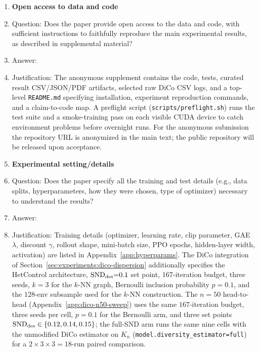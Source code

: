 \begin{enumerate}
\item {\bf Open access to data and code}
    \item[] Question: Does the paper provide open access to the data and code, with sufficient instructions to faithfully reproduce the main experimental results, as described in supplemental material?
    \item[] Answer: \answerYes{}
    \item[] Justification: The anonymous supplement contains the code,
    tests, curated result CSV/JSON/PDF artifacts, selected raw DiCo CSV
    logs, and a top-level \texttt{README.md} specifying installation,
    experiment reproduction commands, and a claim-to-code map. A
    preflight script
    (\texttt{scripts/preflight.sh}) runs the test suite and a
    smoke-training pass on each visible CUDA device to catch
    environment problems before overnight runs. For the anonymous
    submission the repository URL is anonymized in the main text; the
    public repository will be released upon acceptance.

\item {\bf Experimental setting/details}
    \item[] Question: Does the paper specify all the training and test details (e.g., data splits, hyperparameters, how they were chosen, type of optimizer) necessary to understand the results?
    \item[] Answer: \answerYes{}
    \item[] Justification: Training details (optimizer, learning
    rate, clip parameter, GAE $\lambda$, discount $\gamma$, rollout
    shape, mini-batch size, PPO epochs, hidden-layer width, activation)
    are listed in Appendix~\ref{app:hyperparams}. The DiCo integration
    of Section~\ref{sec:experiments:dico-dispersion} additionally
    specifies the HetControl architecture, $\mathrm{SND}_{\mathrm{des}}{=}0.1$
    set point, $167$-iteration budget, three seeds, $k{=}3$ for the
    $k$-NN graph, Bernoulli inclusion probability $p{=}0.1$, and the
    $128$-env subsample used for the $k$-NN construction. The
    $n{=}50$ head-to-head
    (Appendix~\ref{app:dico-n50-sweep}) uses the same $167$-iteration
    budget, three seeds per cell, $p{=}0.1$ for the Bernoulli arm,
    and three set points
    $\mathrm{SND}_{\mathrm{des}}\in\{0.12,0.14,0.15\}$; the full-SND arm
    runs the same nine cells with the unmodified DiCo estimator on
    $K_n$ (\texttt{model.diversity\_estimator=full}) for a
    $2{\times}3{\times}3{=}18$-run paired comparison.


\end{enumerate}
